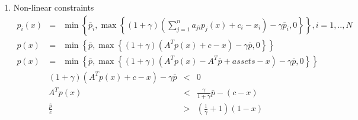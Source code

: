 \documentclass{article}
\begin{document}
\begin{enumerate}
\item Non-linear constraints%
\begin{eqnarray*}
p_{i}\left( x\right) &=&\min \left\{ \bar{p}_{i},\max \left\{ \left(
1+\gamma \right) \left( \sum_{j=1}^{n}a_{ji}p_{j}\left( x\right)
+c_{i}-x_{i}\right) -\gamma \bar{p}_{i},0\right\} \right\} ,i=1,..,N \\
p\left( x\right) &=&\min \left\{ \bar{p},\max \left\{ \left( 1+\gamma
\right) \left( A^{T}p\left( x\right) +c-x\right) -\gamma \bar{p},0\right\}
\right\} \\
p\left( x\right) &=&\min \left\{ \bar{p},\max \left\{ \left( 1+\gamma
\right) \left( A^{T}p\left( x\right) -A^{T}\bar{p}+assets-x\right) -\gamma 
\bar{p},0\right\} \right\}
\end{eqnarray*}%
\begin{eqnarray*}
\left( 1+\gamma \right) \left( A^{T}p\left( x\right) +c-x\right) -\gamma 
\bar{p} &<&0 \\
A^{T}p\left( x\right) &<&\frac{\gamma }{1+\gamma }\bar{p}-\left( c-x\right)
\\
\frac{\bar{p}}{c} &>&\left( \frac{1}{\gamma }+1\right) \left( 1-x\right)
\end{eqnarray*}
\end{enumerate}
\end{document}

